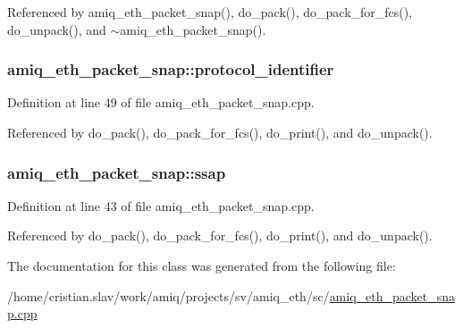 Referenced by amiq\_\-eth\_\-packet\_\-snap(), do\_\-pack(), do\_\-pack\_\-for\_\-fcs(), do\_\-unpack(), and $\sim$amiq\_\-eth\_\-packet\_\-snap().\hypertarget{classamiq__eth__packet__snap_a248cb95f457543532684f7a86e2481b3}{
\subsubsection[{protocol\_\-identifier}]{ {\bf amiq\_\-eth\_\-packet\_\-snap::protocol\_\-identifier}}}
\label{classamiq__eth__packet__snap_a248cb95f457543532684f7a86e2481b3}


Definition at line 49 of file amiq\_\-eth\_\-packet\_\-snap.cpp.

Referenced by do\_\-pack(), do\_\-pack\_\-for\_\-fcs(), do\_\-print(), and do\_\-unpack().\hypertarget{classamiq__eth__packet__snap_a6acbe3de6637a59ffae0b491b8567991}{
\subsubsection[{ssap}]{ {\bf amiq\_\-eth\_\-packet\_\-snap::ssap}}}
\label{classamiq__eth__packet__snap_a6acbe3de6637a59ffae0b491b8567991}


Definition at line 43 of file amiq\_\-eth\_\-packet\_\-snap.cpp.

Referenced by do\_\-pack(), do\_\-pack\_\-for\_\-fcs(), do\_\-print(), and do\_\-unpack().

The documentation for this class was generated from the following file:\begin{DoxyCompactItemize}
\item 
/home/cristian.slav/work/amiq/projects/sv/amiq\_\-eth/sc/\hyperlink{amiq__eth__packet__snap_8cpp}{amiq\_\-eth\_\-packet\_\-snap.cpp}\end{DoxyCompactItemize}
